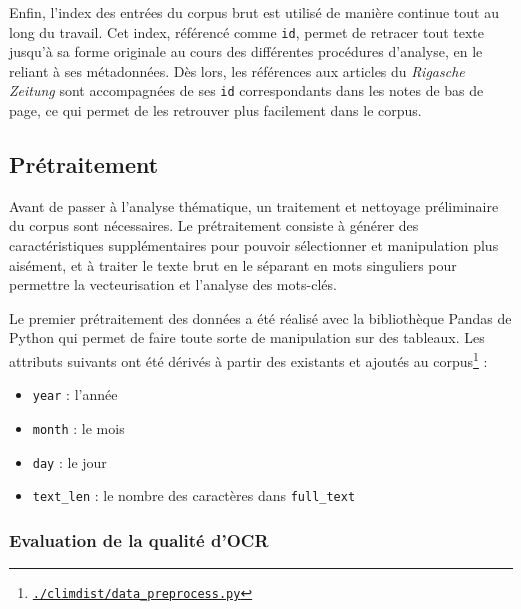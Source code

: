 \documentclass[a4paper,twoside,12pt]{article}
\begin{document}
Enfin, l'index des entrées du corpus brut est utilisé de manière continue tout au long du travail. Cet index, référencé comme \texttt{id}, permet de retracer tout texte jusqu'à sa forme originale au cours des différentes procédures d'analyse, en le reliant à ses métadonnées. Dès lors, les références aux articles du \textit{Rigasche Zeitung} sont accompagnées de ses \texttt{id} correspondants dans les notes de bas de page, ce qui permet de les retrouver plus facilement dans le corpus.

\subsection{Prétraitement}  \label{pretraitement}

Avant de passer à l'analyse thématique, un traitement et nettoyage préliminaire du corpus sont nécessaires. Le prétraitement consiste à générer des caractéristiques supplémentaires pour pouvoir sélectionner et manipulation plus aisément, et à traiter le texte brut en le séparant en mots singuliers pour permettre la vecteurisation et l'analyse des mots-clés.

Le premier prétraitement des données a été réalisé avec la bibliothèque Pandas de Python qui permet de faire toute sorte de manipulation sur des tableaux. Les attributs suivants ont été dérivés à partir des existants et ajoutés au corpus\footnote{\href{https://github.com/krkryger/clim-dist/blob/main/climdist/climdist/data_preprocessing.py}{\texttt{./climdist/data\_preprocess.py}}} :

\vspace{1ex}
\begin{itemize}[label=$\bullet$]
    \item \texttt{year} : l'année
    \item \texttt{month} : le mois
    \item \texttt{day} : le jour
    \item \texttt{text\_len} : le nombre des caractères dans \texttt{full\_text}
\end{itemize}
\vspace{2ex}

\subsubsection{Evaluation de la qualité d'OCR} \label{ocr_quality}
\end{document}
